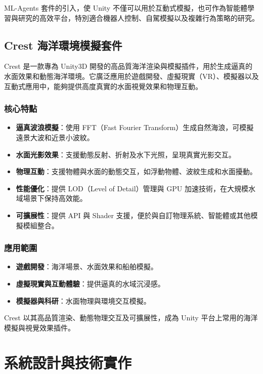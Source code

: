 \documentclass[12pt,a4paper]{ctexart}
\begin{document}
ML-Agents 套件的引入，使 Unity 不僅可以用於互動式模擬，也可作為智能體學習與研究的高效平台，特別適合機器人控制、自駕模擬以及複雜行為策略的研究。


\subsection{Crest 海洋環境模擬套件}
Crest 是一款專為 Unity3D 開發的高品質海洋渲染與模擬插件，用於生成逼真的水面效果和動態海洋環境。它廣泛應用於遊戲開發、虛擬現實（VR）、模擬器以及互動式應用中，能夠提供高度真實的水面視覺效果和物理互動。

\subsubsection{核心特點}
\begin{itemize}
    \item \textbf{逼真波浪模擬}：使用 FFT（Fast Fourier Transform）生成自然海浪，可模擬遠景大波和近景小波紋。
    \item \textbf{水面光影效果}：支援動態反射、折射及水下光照，呈現真實光影交互。
    \item \textbf{物理互動}：支援物體與水面的動態交互，如浮動物體、波紋生成和水面擾動。
    \item \textbf{性能優化}：提供 LOD（Level of Detail）管理與 GPU 加速技術，在大規模水域場景下保持高效能。
    \item \textbf{可擴展性}：提供 API 與 Shader 支援，便於與自訂物理系統、智能體或其他模擬模組整合。
\end{itemize}

\subsubsection{應用範圍}
\begin{itemize}
    \item \textbf{遊戲開發}：海洋場景、水面效果和船舶模擬。
    \item \textbf{虛擬現實與互動體驗}：提供逼真的水域沉浸感。
    \item \textbf{模擬器與科研}：水面物理與環境交互模擬。
\end{itemize}

Crest 以其高品質渲染、動態物理交互及可擴展性，成為 Unity 平台上常用的海洋模擬與視覺效果插件。


\section{系統設計與技術實作}
\end{document}
